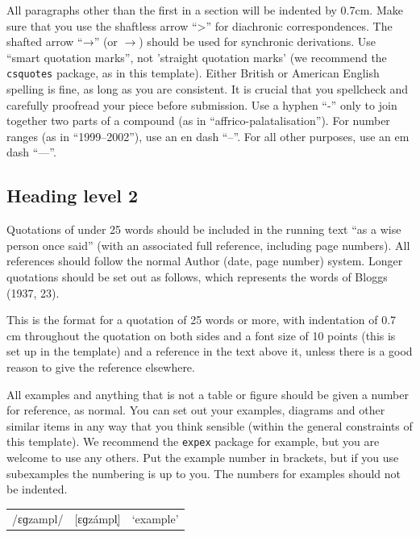 \documentclass[article, a4paper, 12pt]{memoir}
\renewenvironment{quote}{\list{}{\leftmargin=0.7cm\rightmargin=0.7cm}\item[]\footnotesize}{\endlist}
\begin{document}
All paragraphs other than the first in a section will be indented by 0.7cm. Make sure that you use the shaftless arrow \enquote{>} for diachronic correspondences. The shafted arrow \enquote{→} (or $\rightarrow$) should be used for synchronic derivations. Use \enquote{smart quotation marks}, not {'straight quotation marks'} (we recommend the \texttt{csquotes} package, as in this template). Either British or American English spelling is fine, as long as you are consistent. It is crucial that you spellcheck and carefully proofread your piece before submission. Use a hyphen \enquote{-} only to join together two parts of a compound (as in \enquote{affrico-palatalisation}). For number ranges (as in \enquote{1999–2002}), use an en dash \enquote{--}. For all other purposes, use an em dash \enquote{---}.

\subsection{Heading level 2}
\label{sec:heading-level-2}

Quotations of under 25 words should be included in the running text \enquote{as a wise person once said} (with an associated full reference, including page numbers). All references should follow the normal Author (date, page number) system.  Longer quotations should be set out as follows, which represents the words of Bloggs (1937, 23).

\begin{quote}
This is the format for a quotation of 25 words or more, with indentation of 0.7 cm throughout the quotation on both sides and a font size of 10 points (this is set up in the template) and a reference in the text above it, unless there is a good reason to give the reference elsewhere.
\end{quote}

All examples and anything that is not a table or figure should be given a number for reference, as normal. You can set out your examples, diagrams and other similar items in any way that you think sensible (within the general constraints of this template). We recommend the \texttt{expex} package for example, but you are welcome to use any others. Put the example number in brackets, but if you use subexamples the numbering is up to you. The numbers for examples should not be indented.

\ex\begin{tabular}[t]{lll}
     /ɛɡzampl/ & [ɛɡzámpl̩] & `example'
   \end{tabular}
\xe
\end{document}
